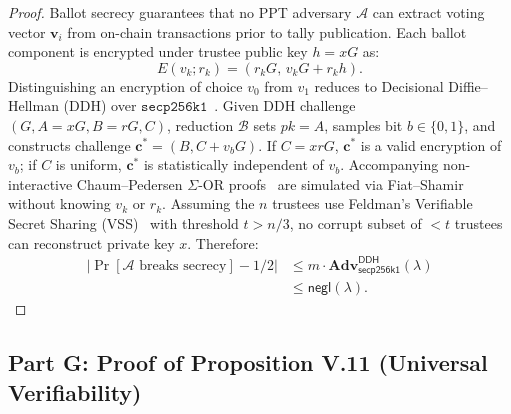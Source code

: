 \documentclass[10pt,letterpaper,journal]{IEEEtran}
\begin{document}
\begin{proof}
Ballot secrecy guarantees that no PPT adversary $\mathcal{A}$ can extract voting vector $\mathbf{v}_i$ from on-chain transactions prior to tally publication.
Each ballot component is encrypted under trustee public key $h = xG$ as:
\begin{equation}
  E(v_k; r_k) = (r_k G, \, v_k G + r_k h).
  \label{eq:elgamal}
\end{equation}
Distinguishing an encryption of choice $v_0$ from $v_1$ reduces to Decisional Diffie--Hellman (DDH) over $\mathtt{secp256k1}$~\cite{elgamal1985public}. Given DDH challenge $(G, A=xG, B=rG, C)$, reduction $\mathcal{B}$ sets $pk = A$, samples bit $b \in \{0,1\}$, and constructs challenge $\mathbf{c}^* = (B, C + v_b G)$.
If $C = xrG$, $\mathbf{c}^*$ is a valid encryption of $v_b$; if $C$ is uniform, $\mathbf{c}^*$ is statistically independent of $v_b$.
Accompanying non-interactive Chaum--Pedersen $\Sigma$-OR proofs~\cite{ChaumPedersen1992} are simulated via Fiat--Shamir~\cite{fiat1987how} without knowing $v_k$ or $r_k$.
Assuming the $n$ trustees use Feldman's Verifiable Secret Sharing (VSS)~\cite{Feldman1987} with threshold $t > n/3$, no corrupt subset of $< t$ trustees can reconstruct private key $x$.
Therefore:
\begin{equation}
\begin{aligned}
  |\Pr[\mathcal{A}\text{ breaks secrecy}] - 1/2|
  &\leq m \cdot \mathbf{Adv}_{\mathsf{secp256k1}}^{\mathsf{DDH}}(\lambda) \\
  &\leq \mathsf{negl}(\lambda).
\end{aligned}
\end{equation}
\end{proof}

\subsection{Part G: Proof of Proposition V.11 (Universal Verifiability)}
\label{sec:supp-proof-verifiability}
\end{document}
